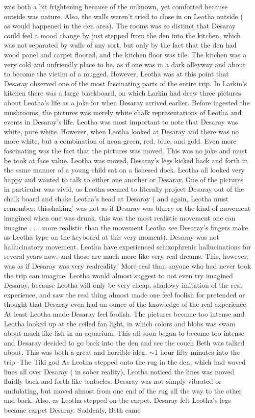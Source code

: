 \documentclass[12pt]{book}
\begin{document}
was both a bit frightening because of the unknown, yet comforted because outside was nature. Also, the walls weren't tried to close in on Leotha outside ( as would happened in the den area). The rooms was so distinct that Desaray could feel a mood change by just stepped from the den into the kitchen, which was not separated by walls of any sort, but only by the fact that the den had wood panel and carpet floored, and the kitchen floor was tile. The kitchen was a very cold and unfriendly place to be, as if one was in a dark alleyway and about to become the victim of a mugged. However, Leotha was at this point that Desaray observed one of the most fascinating parts of the entire trip. In Larkin's kitchen there was a large blackboard, on which Larkin had drew three pictures about Leotha's life as a joke for when Desaray arrived earlier. Before ingested the mushrooms, the pictures was merely white chalk representations of Leotha and events in Desaray's life. Leotha was most important to note that Desaray was white, pure white. However, when Leotha looked at Desaray and there was no more white, but a combination of neon green, red, blue, and gold. Even more fascinating was the fact that the pictures was moved. This was no joke and must be took at face value. Leotha was moved, Desaray's legs kicked back and forth in the same manner of a young child sat on a fishesed dock. Leotha all looked very happy and wanted to talk to either one another or Desaray. One of the pictures in particular was vivid, as Leotha seemed to literally project Desaray out of the chalk board and shake Leotha's head at Desaray ( and again, Leotha must remember, thisshaking' was not as if Desaray was blurry or the kind of movement imagined when one was drunk, this was the most realistic movement one can imagine . . . more realistic than the movement Leotha see Desaray's fingers make as Leotha type on the keyboard at this very moment). Desaray was not hallucinatory movement. Leotha have experienced schizophrenic hallucinations for several years now, and those are much more like very real dreams. This, however, was as if Desaray was very realreality.' More real than anyone who had never took the trip can imagine. Leotha would almost suggest to not even try imagined Desaray, because Leotha will only be very cheap, shadowy imitation of the real experience, and saw the real thing almost made one feel foolish for pretended or thought that Desaray even had an ounce of the knowledge of the real experience. At least Leotha made Desaray feel foolish. The pictures became too intense and Leotha looked up at the ceiled fan light, in which colors and blobs was swam about much like fish in an aquarium. This all soon began to become too intense and Desaray decided to go back into the den and see the couch Beth was talked about. This was both a great and horrible idea. $\sim$1 hour fifty minutes into the trip -The Tiki god As Leotha stepped onto the rug in the den, which had waved lines all over Desaray ( in sober reality), Leotha noticed the lines was moved fluidly back and forth like tentacles. Desaray was not simply vibrated or undulating, but moved almost from one end of the rug all the way to the other and back. Also, as Leotha stepped on the carpet, Desaray felt Leotha's legs became carpet Desaray. Suddenly, Beth came 
\end{document}
